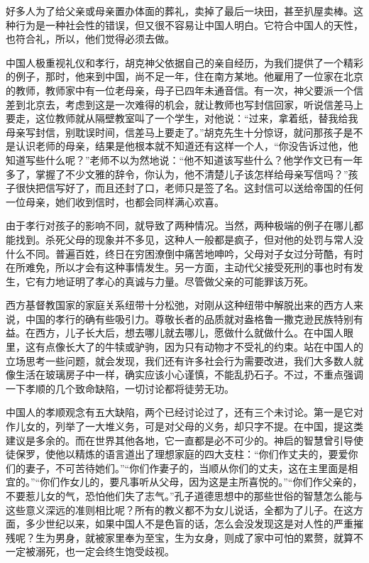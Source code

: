 \documentclass[12pt,oneside]{book}
\begin{document}
\begin{common-format}
好多人为了给父亲或母亲置办体面的葬礼，卖掉了最后一块田，甚至扒屋卖棒。这种行为是一种社会性的错误，但又很不容易让中国人明白。它符合中国人的天性，也符合礼，所以，他们觉得必须去做。 

中国人极重视礼仪和孝行，胡克神父依据自己的亲自经历，为我们提供了一个精彩的例子，那时，他来到中国，尚不足一年，住在南方某地。他雇用了一位家在北京的教师，教师家中有一位老母亲，母子已四年未通音信。有一次，神父要派一个信差到北京去，考虑到这是一次难得的机会，就让教师也写封信回家，听说信差马上要走，这位教师就从隔壁教室叫了一个学生，对他说：“过来，拿着纸，替我给我母亲写封信，别耽误时间，信差马上要走了。”胡克先生十分惊讶，就问那孩子是不是认识老师的母亲，结果是他根本就不知道还有这样一个人，“你没告诉过他，他知道写些什么呢？”老师不以为然地说：“他不知道该写些什么？他学作文已有一年多了，掌握了不少文雅的辞令，你认为，他不清楚儿子该怎样给母亲写信吗？”孩子很快把信写好了，而且还封了口，老师只是签了名。这封信可以送给帝国的任何一位母亲，她们收到信时，也都会同样满心欢喜。 

由于孝行对孩子的影响不同，就导致了两种情况。当然，两种极端的例子在哪儿都能找到。杀死父母的现象并不多见，这种人一般都是疯子，但对他的处罚与常人没什么不同。普遍百姓，终日在穷困潦倒中痛苦地呻吟，父母对子女过分苛酷，有时在所难免，所以才会有这种事情发生。另一方面，主动代父接受死刑的事也时有发生，它有力地证明了孝心的真诚与力量。尽管做父亲的可能罪该万死。 

西方基督教国家的家庭关系纽带十分松弛，对刚从这种纽带中解脱出来的西方人来说，中国的孝行的确有些吸引力。尊敬长者的品质就对盎格鲁一撒克逊民族特别有益。在西方，儿子长大后，想去哪儿就去哪儿，愿做什么就做什么。在中国人眼里，这有点像长大了的牛犊或驴驹，因为只有动物才不受礼的约束。站在中国人的立场思考一些问题，就会发现，我们还有许多社会行为需要改进，我们大多数人就像生活在玻璃房子中一样，确实应该小心谨慎，不能乱扔石子。不过，不重点强调一下孝顺的几个致命缺陷，一切讨论都将徒劳无功。 

中国人的孝顺观念有五大缺陷，两个已经讨论过了，还有三个未讨论。第一是它对作儿女的，列举了一大堆义务，可是对父母的义务，却只字不提。在中国，提这类建议是多余的。而在世界其他各地，它一直都是必不可少的。神启的智慧曾引导使徒保罗，使他以精炼的语言道出了理想家庭的四大支柱：“你们作丈夫的，要爱你们的妻子，不可苦待她们。”“你们作妻子的，当顺从你们的丈夫，这在主里面是相宜的。”“你们作女儿的，要凡事听从父母，因为这是主所喜悦的。”“你们作父亲的，不要惹儿女的气，恐怕他们失了志气。”孔子道德思想中的那些世俗的智慧怎么能与这些意义深远的准则相比呢？所有的教义都不为女儿说话，全都为了儿子。在这方面，多少世纪以来，如果中国人不是色盲的话，怎么会没发现这是对人性的严重摧残呢？生为男身，就被家里奉为至宝，生为女身，则成了家中可怕的累赘，就算不一定被溺死，也一定会终生饱受歧视。 


\end{common-format}
\end{document}
